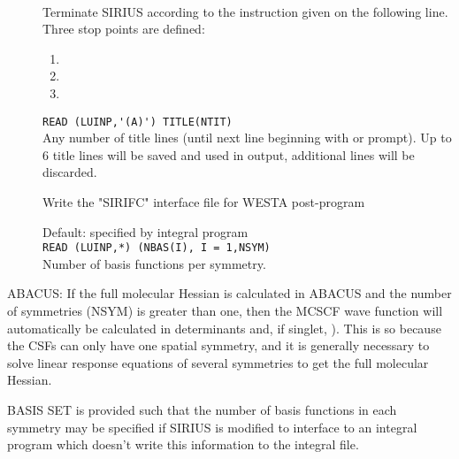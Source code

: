 \begin{description}
\item[]
   \\
  Terminate SIRIUS according to the instruction given on the following line.
  Three stop points are defined:
\begin{enumerate}
 
\item \hspace{2em} 
 
\item \hspace{2em} 
 
\item \hspace{2em} 
\end{enumerate}
 
\item[]
  \verb"READ (LUINP,'(A)') TITLE(NTIT)" \\
  Any number of title lines (until next line beginning with
   or \quotekw{*} prompt).
  Up to 6 title lines will be saved and used in output, additional
  lines will be discarded.
 
\item[]
  Write the "SIRIFC" interface file for WESTA post-program
  
\item[]
   Default: specified by integral program \\
   \verb"READ (LUINP,*) (NBAS(I), I = 1,NSYM)" \\
   Number of basis functions per symmetry.
\end{description}
 

\ifabacus
ABACUS: If the full molecular Hessian is calculated in ABACUS and the
number of symmetries (NSYM) is greater than one, then the MCSCF wave function
will automatically be calculated in determinants
and, if singlet,  
).  This is so because the CSFs can only
have one spatial symmetry, and it is generally necessary to solve linear
response equations of several symmetries to get the full molecular Hessian.
\fi

 
BASIS SET is provided such that the number of basis functions in each
symmetry may be specified if SIRIUS is modified to interface to an
integral program which doesn't write this information to the integral
file.
 
